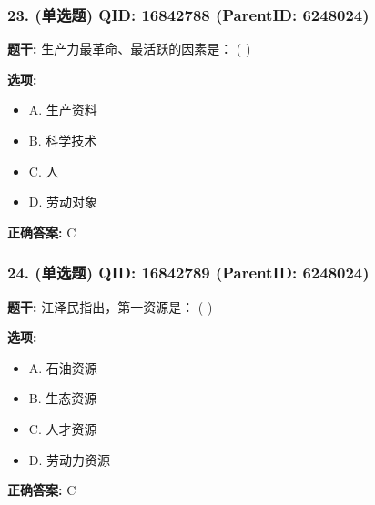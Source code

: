 \documentclass[12pt,UTF8]{ctexart}
\begin{document}
\vspace{0.3em}\hrulefill\vspace{0.7em}

\subsubsection*{23. (单选题) \small QID: 16842788 (ParentID: 6248024)}

\textbf{题干:}
生产力最革命、最活跃的因素是： ( )



\textbf{选项:}
\begin{itemize}[leftmargin=*]

  \item A. 生产资料

  \item B. 科学技术

  \item C. 人

  \item D. 劳动对象

\end{itemize}

\textbf{正确答案:}
C

\vspace{0.3em}\hrulefill\vspace{0.7em}

\subsubsection*{24. (单选题) \small QID: 16842789 (ParentID: 6248024)}

\textbf{题干:}
江泽民指出，第一资源是： ( )



\textbf{选项:}
\begin{itemize}[leftmargin=*]

  \item A. 石油资源

  \item B. 生态资源

  \item C. 人才资源

  \item D. 劳动力资源

\end{itemize}

\textbf{正确答案:}
C

\vspace{0.3em}\hrulefill\vspace{0.7em}
\end{document}
